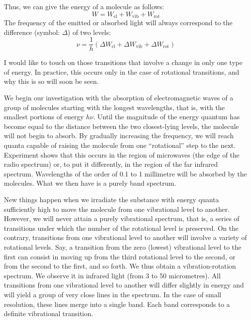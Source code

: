 Thus, we can give the energy of a molecule as follows:
\begin{equation*}%
W = W_{\textrm{el}} + W_{\textrm{vib}} + W_{\textrm{rot}}
\end{equation*}
The frequency of the emitted or absorbed light will always correspond to the difference (symbol: $\Delta$) of two levels:
\begin{equation*}%
\nu = \frac{1}{h} \left( \Delta W_{\textrm{el}} + \Delta W_{\textrm{vib}} + \Delta W_{\textrm{rot}} \right)
\end{equation*}

I would like to touch on those transitions that involve a change in only one type of energy. In practice, this occurs only in the case of rotational transitions, and why this is so will soon be seen.

We begin our investigation with the absorption of electromagnetic waves of a group of molecules starting with the longest wavelengths, that is, with the smallest portions of energy $h\nu$. Until the magnitude of the energy quantum has become equal to the distance between the two closest-lying levels, the molecule will not begin to absorb. By gradually increasing the frequency, we will reach quanta capable of raising the molecule from one ``rotational'' step to the next. Experiment shows that this occurs in the region of microwaves (the edge of the radio spectrum) or, to put it differently, in the region of the far infrared spectrum. Wavelengths of the order of 0.1 to 1 millimetre will be absorbed by the molecules. What we then have is a purely band spectrum.

New things happen when we irradiate the substance with energy quanta sufficiently high to move the molecule from one vibrational level to another. However, we will never attain a purely vibrational spectrum, that is, a series of transitions under which the number of the rotational level is preserved. On the contrary, transitions from one vibrational level to another will involve a variety of rotational levels. Say, a transition from the zero (lowest) vibrational level to the first can consist in moving up from the third rotational level to the second, or from the second to the first, and so forth. We thus obtain a vibration-rotation spectrum. We observe it in infrared light (from 3 to 50 micrometres). All transitions from one vibrational level to another will differ slightly in energy and will yield a group of very close lines in the spectrum. In the case of small resolution, these lines merge into a single band. Each band corresponds to a definite vibrational transition.

